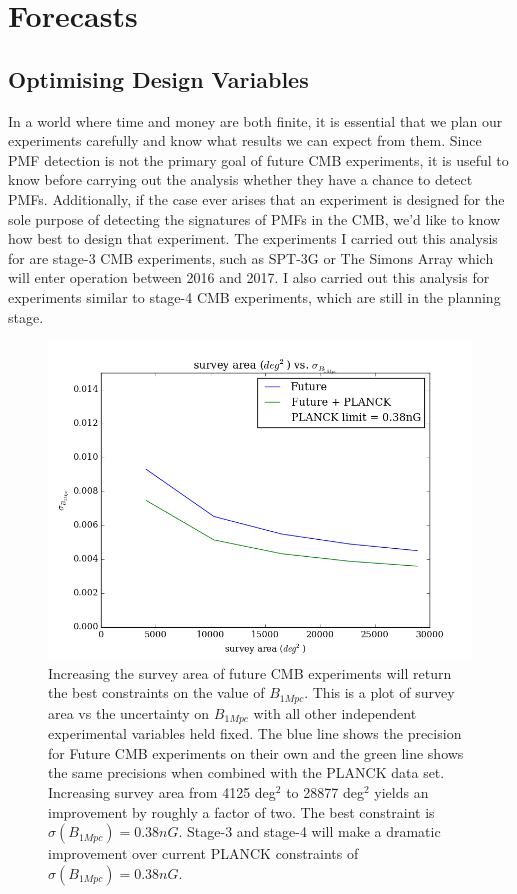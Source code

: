 \section{Forecasts}

\subsection{Optimising Design Variables}
In a world where time and money are both finite, it is essential that we plan our experiments carefully and know what results we can expect from them. Since PMF detection is not the primary goal of future CMB experiments, it is useful to know before carrying out the analysis whether they have a chance to detect PMFs. Additionally, if the case ever arises that an experiment is designed for the sole purpose of detecting the signatures of PMFs in the CMB, we'd like to know how best to design that experiment. The experiments I carried out this analysis for are stage-3 CMB experiments, such as SPT-3G or The Simons Array which will enter operation between 2016 and 2017. I also carried out this analysis for experiments similar to stage-4 CMB experiments, which are still in the planning stage.

\begin{figure}[h]
\centering
\includegraphics[scale=0.7]{images/area.png}
\caption{Increasing the survey area of future CMB experiments will return the best constraints on the value of $B_{1Mpc}$. This is a plot of survey area vs the uncertainty on $B_{1Mpc}$ with all other independent experimental variables held fixed. The blue line shows the precision for Future CMB experiments on their own and the green line shows the same precisions when combined with the PLANCK data set. Increasing survey area from 4125 deg$^2$ to 28877 deg$^2$ yields an improvement by roughly a factor of two. The best constraint is $\sigma(B_{1Mpc}) = 0.38nG$. Stage-3 and stage-4 will make a dramatic improvement over current PLANCK constraints of $\sigma(B_{1Mpc}) = 0.38nG$.}
\label{fig:area}
\end{figure}

